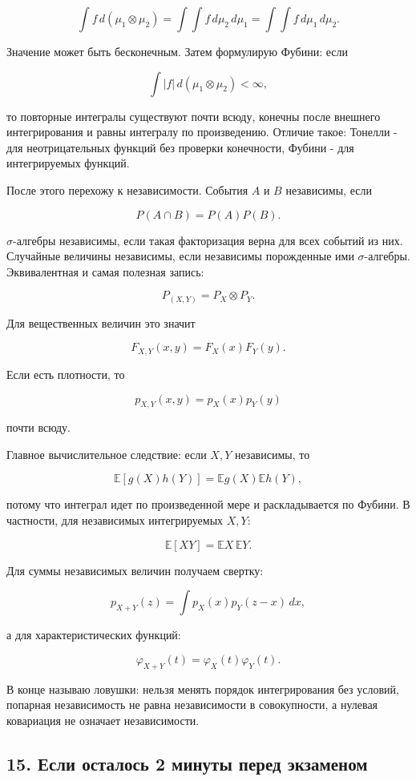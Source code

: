 \documentclass[
  11pt,
  a4paper,
]{article}
\begin{document}
\[
\int f\,d(\mu_1\otimes\mu_2)
=
\int\int f\,d\mu_2\,d\mu_1
=
\int\int f\,d\mu_1\,d\mu_2.
\]

Значение может быть бесконечным. Затем формулирую Фубини: если

\[
\int |f|\,d(\mu_1\otimes\mu_2)<\infty,
\]

то повторные интегралы существуют почти всюду, конечны после внешнего
интегрирования и равны интегралу по произведению. Отличие такое: Тонелли
- для неотрицательных функций без проверки конечности, Фубини - для
интегрируемых функций.

После этого перехожу к независимости. События \(A\) и \(B\) независимы,
если

\[
P(A\cap B)=P(A)P(B).
\]

\(\sigma\)-алгебры независимы, если такая факторизация верна для всех
событий из них. Случайные величины независимы, если независимы
порожденные ими \(\sigma\)-алгебры. Эквивалентная и самая полезная
запись:

\[
P_{(X,Y)}=P_X\otimes P_Y.
\]

Для вещественных величин это значит

\[
F_{X,Y}(x,y)=F_X(x)F_Y(y).
\]

Если есть плотности, то

\[
p_{X,Y}(x,y)=p_X(x)p_Y(y)
\]

почти всюду.

Главное вычислительное следствие: если \(X,Y\) независимы, то

\[
\mathbb E[g(X)h(Y)]
=
\mathbb E g(X)\mathbb E h(Y),
\]

потому что интеграл идет по произведенной мере и раскладывается по
Фубини. В частности, для независимых интегрируемых \(X,Y\):

\[
\mathbb E[XY]=\mathbb EX\,\mathbb EY.
\]

Для суммы независимых величин получаем свертку:

\[
p_{X+Y}(z)=\int p_X(x)p_Y(z-x)\,dx,
\]

а для характеристических функций:

\[
\varphi_{X+Y}(t)=\varphi_X(t)\varphi_Y(t).
\]

В конце называю ловушки: нельзя менять порядок интегрирования без
условий, попарная независимость не равна независимости в совокупности, а
нулевая ковариация не означает независимости.

\subsection{15. Если осталось 2 минуты перед
экзаменом}\label{ux435ux441ux43bux438-ux43eux441ux442ux430ux43bux43eux441ux44c-2-ux43cux438ux43dux443ux442ux44b-ux43fux435ux440ux435ux434-ux44dux43aux437ux430ux43cux435ux43dux43eux43c}
\end{document}

